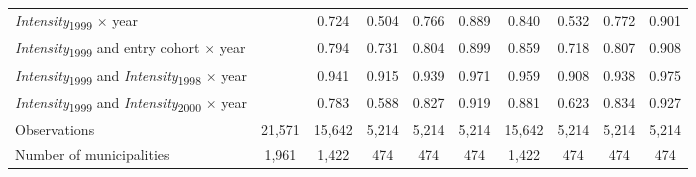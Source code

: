 \begin{tabular}{lccccccccc}
\quad \textit{Intensity}\textsubscript{1999} \(\times\) year &  & 0.724 & 0.504 & 0.766 & 0.889 & 0.840 & 0.532 & 0.772 & 0.901 \\ 
\quad \textit{Intensity}\textsubscript{1999} and entry cohort \(\times\) year &  & 0.794 & 0.731 & 0.804 & 0.899 & 0.859 & 0.718 & 0.807 & 0.908 \\ 
\quad \textit{Intensity}\textsubscript{1999} and \textit{Intensity}\textsubscript{1998} \(\times\) year &  & 0.941 & 0.915 & 0.939 & 0.971 & 0.959 & 0.908 & 0.938 & 0.975 \\ 
\quad \textit{Intensity}\textsubscript{1999} and \textit{Intensity}\textsubscript{2000} \(\times\) year &  & 0.783 & 0.588 & 0.827 & 0.919 & 0.881 & 0.623 & 0.834 & 0.927 \\ 
Observations & 21,571 & 15,642 & 5,214 & 5,214 & 5,214 & 15,642 & 5,214 & 5,214 & 5,214 \\ 
Number of municipalities & 1,961 & 1,422 & 474 & 474 & 474 & 1,422 & 474 & 474 & 474 \\ 
\bottomrule
\end{tabular}